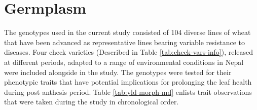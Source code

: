 \documentclass[12pt,oneside]{dukestatscithesis} %
\begin{document}
\hypertarget{germplasm}{%
\section{Germplasm}\label{germplasm}}

The genotypes used in the current study consisted of 104 diverse lines of wheat that have been advanced as representative lines bearing variable resistance to diseases. Four check varieties (Described in Table \ref{tab:check-vars-info}), released at different periods, adapted to a range of environmental conditions in Nepal were included alongside in the study. The genotypes were tested for their phenotypic traits that have potential implications for prolonging the leaf health during post anthesis period. Table \ref{tab:yld-morph-md} enlists trait observations that were taken during the study in chronological order.
\end{document}
